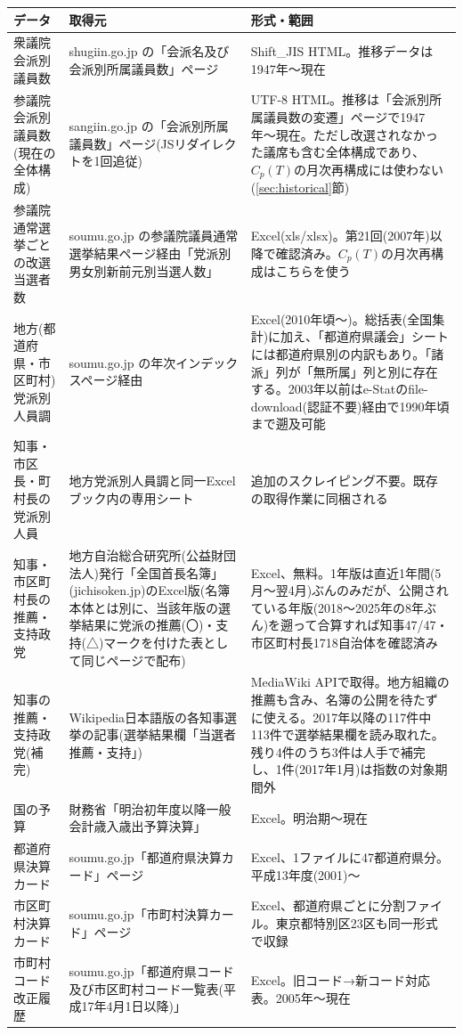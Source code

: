 \documentclass[a4paper,11pt]{ltjsarticle}
\begin{document}
\begin{longtable}{p{3.0cm}p{6.4cm}p{5.0cm}}
\toprule
データ & 取得元 & 形式・範囲 \\
\midrule
\endhead
衆議院 会派別議員数 & shugiin.go.jp の「会派名及び会派別所属議員数」ページ & Shift\_JIS HTML。推移データは1947年〜現在 \\
参議院 会派別議員数(現在の全体構成) & sangiin.go.jp の「会派別所属議員数」ページ(JSリダイレクトを1回追従) & UTF-8 HTML。推移は「会派別所属議員数の変遷」ページで1947年〜現在。ただし改選されなかった議席も含む全体構成であり、$C_p(T)$の月次再構成には使わない(\ref{sec:historical}節) \\
参議院 通常選挙ごとの改選当選者数 & soumu.go.jp の参議院議員通常選挙結果ページ経由「党派別男女別新前元別当選人数」 & Excel(xls/xlsx)。第21回(2007年)以降で確認済み。$C_p(T)$の月次再構成はこちらを使う \\
地方(都道府県・市区町村)党派別人員調 & soumu.go.jp の年次インデックスページ経由 & Excel(2010年頃〜)。総括表(全国集計)に加え、「都道府県議会」シートには都道府県別の内訳もあり。「諸派」列が「無所属」列と別に存在する。2003年以前はe-Statのfile-download(認証不要)経由で1990年頃まで遡及可能 \\
知事・市区長・町村長の党派別人員 & 地方党派別人員調と同一Excelブック内の専用シート & 追加のスクレイピング不要。既存の取得作業に同梱される \\
知事・市区町村長の推薦・支持政党 & 地方自治総合研究所(公益財団法人)発行「全国首長名簿」(jichisoken.jp)のExcel版(名簿本体とは別に、当該年版の選挙結果に党派の推薦(〇)・支持(△)マークを付けた表として同じページで配布) & Excel、無料。1年版は直近1年間(5月〜翌4月)ぶんのみだが、公開されている年版(2018〜2025年の8年ぶん)を遡って合算すれば知事47/47・市区町村長1718自治体を確認済み \\
知事の推薦・支持政党(補完) & Wikipedia日本語版の各知事選挙の記事(選挙結果欄「当選者推薦・支持」) & MediaWiki APIで取得。地方組織の推薦も含み、名簿の公開を待たずに使える。2017年以降の117件中113件で選挙結果欄を読み取れた。残り4件のうち3件は人手で補完し、1件(2017年1月)は指数の対象期間外 \\
国の予算 & 財務省「明治初年度以降一般会計歳入歳出予算決算」 & Excel。明治期〜現在 \\
都道府県決算カード & soumu.go.jp「都道府県決算カード」ページ & Excel、1ファイルに47都道府県分。平成13年度(2001)〜 \\
市区町村決算カード & soumu.go.jp「市町村決算カード」ページ & Excel、都道府県ごとに分割ファイル。東京都特別区23区も同一形式で収録 \\
市町村コード改正履歴 & soumu.go.jp「都道府県コード及び市区町村コード一覧表(平成17年4月1日以降)」 & Excel。旧コード→新コード対応表。2005年〜現在 \\
\bottomrule
\end{longtable}
\end{document}
